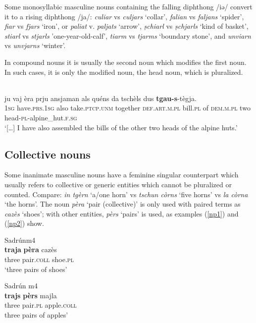 Some monosyllabic masculine nouns containing the falling diphthong /iə/ convert it to a rising diphthong /ja/: \textit{culiar} vs \textit{culjars} `collar', \textit{falian} vs \textit{faljans} `spider', \textit{fiar} vs \textit{fjars} `iron', or \textit{paliat} v. \textit{paljats} `arrow', \textit{ṣchiarl} vs \textit{ṣchjarls} `kind of basket', \textit{stiarl} vs \textit{stjarls} 'one-year-old-calf', \textit{tiarm} vs \textit{tjarms} `boundary stone', and \textit{unviarn} vs \textit{unvjarns} `winter'.

In compound nouns it is usually the second noun which modifies the first noun. In such cases, it is only the modified noun, the head noun, which is pluralized.


\ea\label{ex: }
\\
\gll  […] ju vaj\footnotemark{} èra prju ansjaman als quéns da tschèls dus \textbf{tgau}\textbf{-s}-tègja.  \\
    {} \textsc{1sg} have.\textsc{prs.1sg} also take.\textsc{ptcp.unm} together \textsc{def.art.m.pl} bill.\textsc{pl} of \textsc{dem.m.pl} two head-\textsc{pl}-alpine\_hut.\textsc{f.sg} \\
\glt `[…] I have also assembled the bills of the other two heads of the alpine huts.'
\z

\subsection{Collective nouns}
Some inanimate masculine nouns have a feminine singular counterpart which usually refers to collective or generic entities which cannot be pluralized or counted. Compare: \textit{ in tgèrn} `a/one horn’ vs \textit{tschun còrns} `five horns’ vs \textit{la còrna} `the horns’. The noun \textit{pèra} `pair (collective)' is only used with paired terms as \textit{cazès} `shoes'; with other entities, \textit{pèrs} `pairs' is used, as examples (\ref{np1}) and (\ref{np2}) show. 

\ea\label{np1}
 {Sadrún}{m4}\\
\gll    \textbf{traja} \textbf{pèra} cazès \\
three pair.\textsc{coll} shoe.\textsc{pl}\\
\glt `three pairs of shoes'
\z

\ea\label{np2}
 {Sadrún} {m4}\\
\gll    \textbf{trajs} \textbf{pèrs} majla\\
three pair.\textsc{pl} apple.\textsc{coll}\\
\glt  three pairs of apples'
\z


